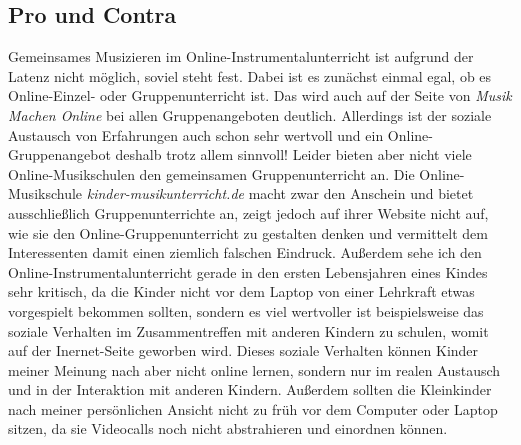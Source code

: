 \subsection{Pro und Contra}
Gemeinsames Musizieren im Online-Instrumentalunterricht ist aufgrund der Latenz
nicht möglich, soviel steht fest. Dabei ist es zunächst einmal egal, ob es
Online-Einzel- oder Gruppenunterricht ist. Das wird auch auf der Seite von
\emph{Musik Machen Online} bei allen Gruppenangeboten deutlich. Allerdings ist
der soziale Austausch von Erfahrungen auch schon sehr wertvoll und ein
Online-Gruppenangebot deshalb trotz allem sinnvoll! Leider bieten aber nicht
viele Online-Musikschulen den gemeinsamen Gruppenunterricht an. Die
Online-Musikschule \emph{kinder-musikunterricht.de} macht zwar den Anschein und
bietet ausschließlich Gruppenunterrichte an, zeigt jedoch auf ihrer Website
nicht auf, wie sie den Online-Gruppenunterricht zu gestalten denken und
vermittelt dem Interessenten damit einen ziemlich falschen Eindruck. Außerdem
sehe ich den Online-Instrumentalunterricht gerade in den ersten Lebensjahren
eines Kindes sehr kritisch, da die Kinder nicht vor dem Laptop von einer
Lehrkraft etwas vorgespielt bekommen sollten, sondern es viel wertvoller ist
beispielsweise das soziale Verhalten im Zusammentreffen mit anderen Kindern zu
schulen, womit auf der Inernet-Seite geworben wird. Dieses soziale Verhalten
können Kinder meiner Meinung nach aber nicht online lernen, sondern nur im
realen Austausch und in der Interaktion mit anderen Kindern. Außerdem sollten
die Kleinkinder nach meiner persönlichen Ansicht nicht zu früh vor dem Computer
oder Laptop sitzen, da sie Videocalls noch nicht abstrahieren und einordnen
können. 

